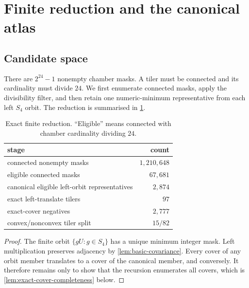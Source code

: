 \section{Finite reduction and the canonical atlas}
\label{sec:finite-reduction}

\subsection{Candidate space}

There are $2^{24}-1$ nonempty chamber masks.  A tiler must be connected and
its cardinality must divide $24$.  We first enumerate connected masks, apply
the divisibility filter, and then retain one numeric-minimum representative
from each left $S_4$ orbit.  The reduction is summarised in
\cref{tab:reduction}.

\begin{table}[ht]
\centering
\caption{Exact finite reduction.  ``Eligible'' means connected with chamber
cardinality dividing $24$.}
\label{tab:reduction}
\begin{tabular}{@{}lr@{}}
\toprule
stage & count\\
\midrule
connected nonempty masks & $1{,}210{,}648$\\
eligible connected masks & $67{,}681$\\
canonical eligible left-orbit representatives & $2{,}874$\\
exact left-translate tilers & $97$\\
exact-cover negatives & $2{,}777$\\
convex/nonconvex tiler split & $15/82$\\
\bottomrule
\end{tabular}
\end{table}

\begin{proof}
The finite orbit $\{gU:g\in S_4\}$ has a unique minimum integer mask.  Left
multiplication preserves adjacency by \cref{lem:basic-covariance}.  Every
cover of any orbit member translates to a cover of the canonical member, and
conversely.  It therefore remains only to show that the recursion enumerates
all covers, which is \cref{lem:exact-cover-completeness} below.
\end{proof}

